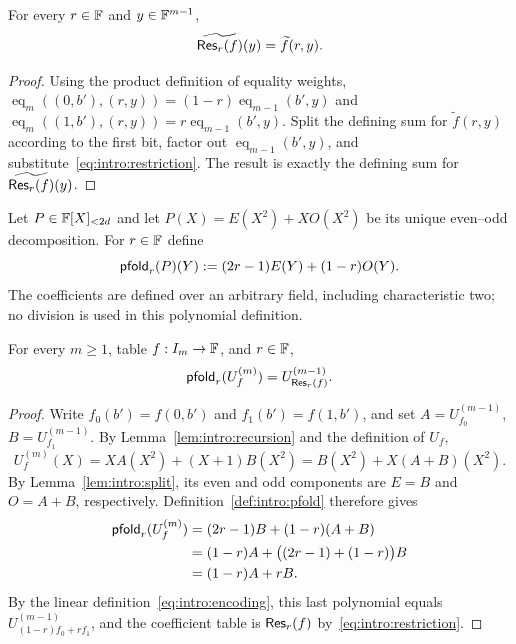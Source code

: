 \begin{lemma}\label{lem:intro:restriction}
For every $r\in\mathbb{F}$ and $y\in\mathbb{F}^{m-1}$,
\begin{equation}\label{eq:intro:mle-rest}
 \widetilde{\mathsf{Res}_r(f)}(y)=\widetilde f(r,y).
\end{equation}
\end{lemma}
\begin{proof}
Using the product definition of equality weights, $\operatorname{eq}_m((0,b'),(r,y))=(1-r)\operatorname{eq}_{m-1}(b',y)$ and $\operatorname{eq}_m((1,b'),(r,y))=r\operatorname{eq}_{m-1}(b',y)$. Split the defining sum for $\widetilde f(r,y)$ according to the first bit, factor out $\operatorname{eq}_{m-1}(b',y)$, and substitute~\eqref{eq:intro:restriction}. The result is exactly the defining sum for $\widetilde{\mathsf{Res}_r(f)}(y)$.
\end{proof}

\begin{definition}\label{def:intro:pfold}
Let $P\in\mathbb{F}[X]_{<2d}$ and let $P(X)=E(X^2)+XO(X^2)$ be its unique even--odd decomposition. For $r\in\mathbb{F}$ define
\begin{equation}\label{eq:intro:pfold}
 \mathsf{pfold}_r(P)(Y):=(2r-1)E(Y)+(1-r)O(Y).
\end{equation}
The coefficients are defined over an arbitrary field, including characteristic two; no division is used in this polynomial definition.
\end{definition}

\begin{theorem}\label{thm:intro:dictionary}
For every $m\geq1$, table $f:I_m\to\mathbb{F}$, and $r\in\mathbb{F}$,
\begin{equation}\label{eq:intro:dictionary}
 \mathsf{pfold}_r(U_f^{(m)})=U_{\mathsf{Res}_r(f)}^{(m-1)}.
\end{equation}
\end{theorem}
\begin{proof}
Write $f_0(b')=f(0,b')$ and $f_1(b')=f(1,b')$, and set $A=U_{f_0}^{(m-1)}$, $B=U_{f_1}^{(m-1)}$. By Lemma~\ref{lem:intro:recursion} and the definition of $U_f$,
\[
 U_f^{(m)}(X)=XA(X^2)+(X+1)B(X^2)=B(X^2)+X(A+B)(X^2).
\]
By Lemma~\ref{lem:intro:split}, its even and odd components are $E=B$ and $O=A+B$, respectively. Definition~\ref{def:intro:pfold} therefore gives
\begin{align*}
 \mathsf{pfold}_r(U_f^{(m)})
  &=(2r-1)B+(1-r)(A+B)\\
  &=(1-r)A+\big((2r-1)+(1-r)\big)B\\
  &=(1-r)A+rB.
\end{align*}
By the linear definition~\eqref{eq:intro:encoding}, this last polynomial equals $U_{(1-r)f_0+rf_1}^{(m-1)}$, and the coefficient table is $\mathsf{Res}_r(f)$ by~\eqref{eq:intro:restriction}.
\end{proof}


